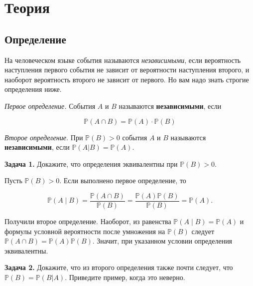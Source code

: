 
\section{Теория}

\subsection{Определение}

На человеческом языке события называются \emph{независимыми}, если вероятность наступления первого события не зависит от вероятности наступления второго, и наоборот вероятность второго не зависит от первого. Но вам надо знать строгие определения ниже.

\begin{definition}
\emph{Первое определение.} События $A$ и $B$ называются \textbf{независимыми}, если

\[\mathbb{P}(A\cap B) = \mathbb{P}(A)\cdot \mathbb{P}(B)\]
\end{definition}

\begin{definition}
\emph{Второе определение.} При $\mathbb{P}(B)>0$ события $A$ и $B$ называются \textbf{независимыми}, если $\mathbb{P}(A\vert B) = \mathbb{P}(A)$.
\end{definition}

\begin{task}\label{task-theory-1}
\textbf{Задача 1.} Докажите, что определения эквивалентны при $\mathbb{P}(B)>0$.
\end{task}

\begin{solution}\label{solution-independent-events-theory-1}
Пусть $\mathbb P(B)>0$. Если выполнено первое определение, то

\[\mathbb P(A\mid B)=\frac{\mathbb P(A\cap B)}{\mathbb P(B)}=\frac{\mathbb P(A)\mathbb P(B)}{\mathbb P(B)}=\mathbb P(A).\]

Получили второе определение. Наоборот, из равенства $\mathbb P(A\mid B)=\mathbb P(A)$ и формулы условной вероятности после умножения на $\mathbb P(B)$ следует $\mathbb P(A\cap B)=\mathbb P(A)\mathbb P(B)$. Значит, при указанном условии определения эквивалентны.
\end{solution}

\begin{task}\label{task-theory-2}
\textbf{Задача 2.} Докажите, что из второго определения также почти следует, что $\mathbb{P}(B) = \mathbb{P}(B\vert A)$. Приведите пример, когда это неверно.
\end{task}

